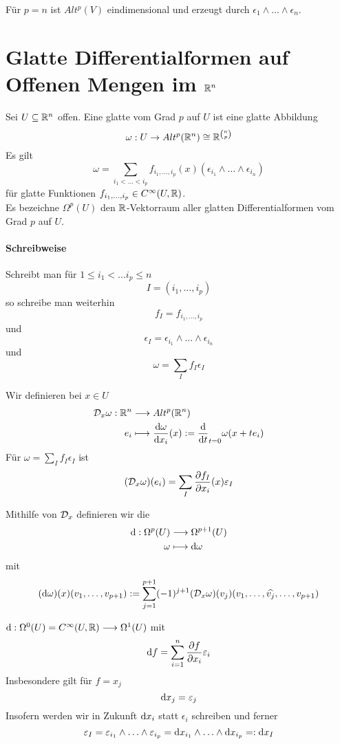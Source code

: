 \Bsp{}
Für $p = n$ ist $Alt^p(V)$ eindimensional und erzeugt durch $\epsilon_1 \wedge \ldots \wedge \epsilon_n$.

\section{Glatte Differentialformen auf Offenen Mengen im $\mathbb{R}^n$}
Sei $U \subseteq \mathbb{R}^n$ offen.
\Def{}
Eine glatte  vom Grad $p$ auf $U$ ist eine glatte Abbildung
\[ \omega : U \overset{}{\rightarrow} Alt^p(\mathbb{R}^n) \overset{}{\cong} \mathbb{R}^{\binom{n}{p}} \]
Es gilt
\[ \omega = \sum_{i_1 < \ldots <i_p} f_{i_1,\ldots, i_p}(x) (\epsilon_{i_1} \wedge \ldots \wedge \epsilon_{i_n}) \]
für glatte Funktionen $f_{i_1,\ldots,i_p} \in C^\infty (U,\mathbb{R})$.\\
Es bezeichne $\Omega^p(U)$ den $\mathbb{R}$-Vektorraum aller glatten Differentialformen vom Grad $p$ auf $U$.

\paragraph{Schreibweise} Schreibt man für $1\leq i_1< \ldots i_p\leq n$
\[ I = (i_1, \ldots, i_p)  \]
so schreibe man weiterhin
\[ f_I = f_{i_1,\ldots, i_p} \]
und
\[ \epsilon_I = \epsilon_{i_1} \wedge \ldots \wedge \epsilon_{i_n} \]
und
\[ \omega = \sum_{I}f_I \epsilon_I \]

\Def{}
Wir definieren  bei $x \in U$
\begin{align*}
\mathcal{D}_x\omega : \mathbb{R}^n & \overset{}{\longrightarrow} Alt^p(\mathbb{R}^n)\\
e_i & \longmapsto  \frac{\text{d} \omega}{\text{d} x_i}(x) := \frac{\text{d}}{\text{d} t}_{t = 0} \omega(x + te_i)
\end{align*}
Für $\omega = \sum_{I}f_I \epsilon_I$ ist
\[ (\mathcal{D}_x \omega)(e_i) = \sum_{I} \frac{\partial f_I}{\partial x_i}(x) \varepsilon_I \]

\Def{}
Mithilfe von $\mathcal{D}_x$ definieren wir die 
\begin{align*}
\text{d} : \Omega^p(U) & \overset{}{\longrightarrow} \Omega^{p+1}(U)\\
\omega & \longmapsto \text{d} \omega
\end{align*}
mit
\[ (\text{d} \omega)(x)(v_1, \ldots, v_{p+1}) := \sum_{j=1}^{p+1} (-1)^{j+1} (\mathcal{D}_x \omega) (v_j) (v_1, \ldots, \widehat{v_j}, \ldots, v_{p+1}) \]

\Bsp{}
$\text{d} : \Omega^0(U) = C^\infty(U,\mathbb{R}) \overset{}{\longrightarrow} \Omega^1 (U)$ mit
\[ \text{d} f = \sum_{i = 1}^{n} \frac{\partial f}{\partial x_i} \varepsilon_i \]
Insbesondere gilt für $f = x_j$
\[ \text{d} x_j = \varepsilon_j \]
Insofern werden wir in Zukunft $\text{d} x_i$ statt $\epsilon_i$ schreiben und ferner
\[ \varepsilon_I = \varepsilon_{i_1} \wedge\ldots \wedge \varepsilon_{i_p} = \text{d} x_{i_1} \wedge\ldots \wedge \text{d} x_{i_p} =: \text{d} x_I \]

